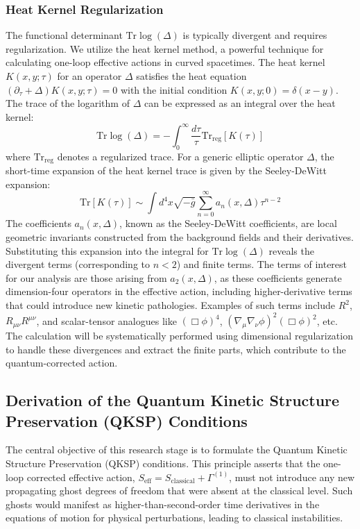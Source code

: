 \documentclass[twocolumn]{aastex631}
\begin{document}
\subsubsection{Heat Kernel Regularization}
The functional determinant $\text{Tr} \log(\Delta)$ is typically divergent and requires regularization. We utilize the heat kernel method, a powerful technique for calculating one-loop effective actions in curved spacetimes. The heat kernel $K(x, y; \tau)$ for an operator $\Delta$ satisfies the heat equation $(\partial_\tau + \Delta) K(x, y; \tau) = 0$ with the initial condition $K(x, y; 0) = \delta(x-y)$. The trace of the logarithm of $\Delta$ can be expressed as an integral over the heat kernel:
\begin{equation}
\text{Tr} \log(\Delta) = -\int_0^\infty \frac{d\tau}{\tau} \text{Tr}_{\text{reg}}[K(\tau)]
\end{equation}
where $\text{Tr}_{\text{reg}}$ denotes a regularized trace. For a generic elliptic operator $\Delta$, the short-time expansion of the heat kernel trace is given by the Seeley-DeWitt expansion:
\begin{equation}
\text{Tr}[K(\tau)] \sim \int d^4x \sqrt{-\bar{g}} \sum_{n=0}^{\infty} a_n(x, \Delta) \tau^{n-2}
\end{equation}
The coefficients $a_n(x, \Delta)$, known as the Seeley-DeWitt coefficients, are local geometric invariants constructed from the background fields and their derivatives. Substituting this expansion into the integral for $\text{Tr} \log(\Delta)$ reveals the divergent terms (corresponding to $n < 2$) and finite terms. The terms of interest for our analysis are those arising from $a_2(x, \Delta)$, as these coefficients generate dimension-four operators in the effective action, including higher-derivative terms that could introduce new kinetic pathologies. Examples of such terms include $R^2$, $R_{\mu\nu}R^{\mu\nu}$, and scalar-tensor analogues like $(\Box\phi)^4$, $(\nabla_\mu\nabla_\nu\phi)^2 (\Box\phi)^2$, etc. The calculation will be systematically performed using dimensional regularization to handle these divergences and extract the finite parts, which contribute to the quantum-corrected action.

\subsection{Derivation of the Quantum Kinetic Structure Preservation (QKSP) Conditions}
The central objective of this research stage is to formulate the Quantum Kinetic Structure Preservation (QKSP) conditions. This principle asserts that the one-loop corrected effective action, $S_{\text{eff}} = S_{\text{classical}} + \Gamma^{(1)}$, must not introduce any new propagating ghost degrees of freedom that were absent at the classical level. Such ghosts would manifest as higher-than-second-order time derivatives in the equations of motion for physical perturbations, leading to classical instabilities.
\end{document}
